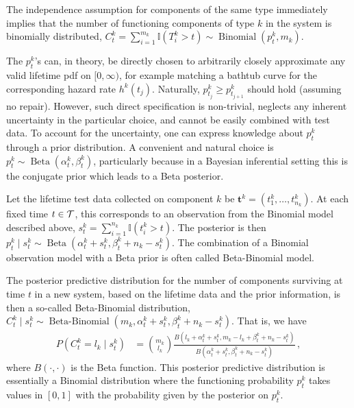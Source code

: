 \documentclass[12pt, a4paper]{elsarticle}
\newcommand{\bs}[1]{\boldsymbol{#1}}
\renewcommand{\vec}[1]{{\bs#1}}
\newcommand{\indic}{\mathbb{I}}
\newcommand{\bin}{\operatorname{Binomial}}
\newcommand{\be}{\operatorname{Beta}}
\newcommand{\bebin}{\operatorname{Beta-Binomial}}
\newcommand{\ptk}{p^k_t}
\newcommand{\td}[1]{%
  \iftoggle{td}{%
    \todo[inline]{#1}%
  }{}%
}
\begin{document}
\td{***illustrate discrete distribution with a graph of R, f, h?***}

The independence assumption for components of the same type immediately implies that 
the number of functioning components of type $k$ in the system
is binomially distributed, $C^k_t = \sum_{i=1}^{m_k} \indic(T^k_i > t) \sim \bin(\ptk, m_k)$.

The $\ptk$'s can, in theory, be directly chosen to arbitrarily closely approximate any valid lifetime pdf on
$[0,\infty)$, for example matching a bathtub curve for the corresponding hazard rate $h^k(t_j)$.
Naturally, $p^k_{t_j} \ge p^k_{t_{j+1}}$ should hold (assuming no repair).
However, such direct specification is non-trivial, neglects any inherent uncertainty in the particular choice, and cannot be 
easily combined with test data.
To account for the uncertainty, one can express knowledge about $\ptk$ through a prior distribution.
A convenient and natural choice is $\ptk \sim \be(\alpha^k_t, \beta^k_t)$, particularly because in a Bayesian inferential
setting this is the conjugate prior which leads to a Beta posterior.

Let the lifetime test data collected on component $k$ be $\vec{t}^k = (t^k_1, \ldots, t^k_{n_k})$.
At each fixed time $t \in {\cal T}$, this corresponds to an observation from the Binomial model described above,
$s^k_t = \sum_{i=1}^{n_k} \indic(t^k_i > t)$.
The posterior is then $\ptk \mid s^k_t \sim \be(\alpha^k_t + s^k_t, \beta^k_t + n_k - s^k_t)$.
The combination of a Binomial observation model with a Beta prior is often called Beta-Binomial model.

The posterior predictive distribution for the number of components surviving at time $t$
in a new system, based on the lifetime data and the prior information,
is then a so-called Beta-Binomial distribution,
$C^k_t \mid s^k_t \sim \bebin(m_k, \alpha^k_t + s^k_t, \beta^k_t + n_k - s^k_t)$.
That is, we have
\begin{align*}
P(C^k_t = l_k \mid s^k_t) &= {m_k \choose l_k} \frac{B(l_k + \alpha^k_t + s^k_t, m_k - l_k + \beta^k_t + n_k - s^k_t)}
                                                    {B(\alpha^k_t + s^k_t, \beta^k_t + n_k - s^k_t)} \,,
\end{align*}
where $B(\cdot, \cdot)$ is the Beta function.
This posterior predictive distribution is essentially a Binomial distribution
where the functioning probability $\ptk$ takes values in $[0,1]$
with the probability given by the posterior on $\ptk$.
\end{document}
